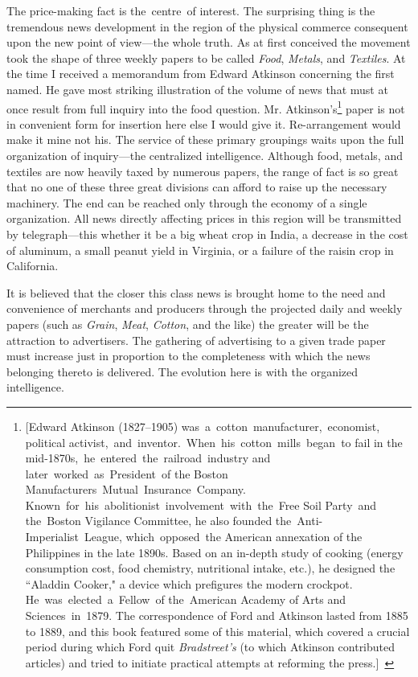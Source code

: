 \documentclass[openany,nobib]{tufte-book}
\begin{document}
The price-making fact is the~centre~of interest. The surprising thing is
the tremendous news development in the region of the physical commerce
consequent upon the new point of view---the whole truth. As at first
conceived the movement took the shape of three weekly papers to be
called \emph{Food}, \emph{Metals}, and \emph{Textiles}. At the time I
received a memorandum from Edward Atkinson concerning the first named.
He gave most striking illustration of the volume of news that must at
once result from full inquiry into the food question. Mr.
Atkinson's\footnote{{[}Edward Atkinson (1827--1905)
  was~a~cotton~manufacturer,~economist, political
  activist,~and~inventor.~When~his~cotton~mills~began~to fail in the
  mid-1870s,~he~entered~the~railroad~industry and
  later~worked~as~President~of the Boston
  Manufacturers~Mutual~Insurance~Company.
  Known~for~his~abolitionist~involvement~with~the~Free Soil Party~and
  the~Boston Vigilance Committee, he also founded
  the~Anti-Imperialist~League, which~opposed~the American annexation of
  the Philippines in the late 1890s. Based on an in-depth study of
  cooking (energy consumption cost, food chemistry, nutritional intake,
  etc.), he designed the ``Aladdin Cooker," a device which prefigures
  the modern crockpot. He~was~elected~a~Fellow~of the~American Academy
  of Arts and Sciences~in~1879. The correspondence of Ford and Atkinson
  lasted from 1885 to 1889, and this book featured some of this
  material, which covered a crucial period during which Ford quit
  \emph{Bradstreet's} (to which Atkinson contributed articles) and tried
  to initiate practical attempts at reforming the press.{]}~} paper is
not in convenient form for insertion here else I would give it.
Re-arrangement would make it mine not his. The service of these primary
groupings waits upon the full organization of inquiry---the centralized
intelligence. Although food, metals, and textiles are now heavily taxed
by numerous papers, the range of fact is so great that no one of these
three great divisions can afford to raise up the necessary machinery.
The end can be reached only through the economy of a single
organization. All news directly affecting prices in this region will be
transmitted by telegraph---this whether it be a big wheat crop in India,
a decrease in the cost of aluminum, a small peanut yield in Virginia, or
a failure of the raisin crop in California.~

It is believed that the closer this class news is brought home to the
need and convenience of merchants and producers through the projected
daily and weekly papers (such as \emph{Grain}, \emph{Meat},
\emph{Cotton}, and the like) the greater will be the attraction to
advertisers. The gathering of advertising to a given trade paper must
increase just in proportion to the completeness with which the news
belonging thereto is delivered. The evolution here is with the organized
intelligence.~
\end{document}
